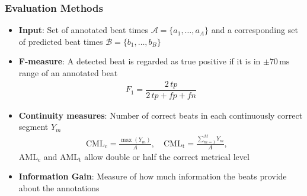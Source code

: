 \documentclass{beamer}
\begin{document}
% 

\begin{frame}
\frametitle{Evaluation Methods}

\begin{itemize}
\item \textbf{Input}: Set of annotated beat times $\mathcal A = \{a_1, \dots, a_A\}$ and a corresponding set of predicted beat times $\mathcal B = \{b_1, \dots, b_B\}$
\item \textbf{F-measure}: A detected beat is regarded as true positive if it is in $\pm 70\,\text{ms}$ range of an annotated beat
\begin{align}
F_1= \dfrac{2\, tp}{2\, tp + fp + fn}
\end{align} 
\item \textbf{Continuity measures}: Number of correct beats in each continuously correct segment $Y_m$
\begin{align}
\text{CML}_\text{c} = \frac{\max(Y_m)}{A}, \quad
\text{CML}_\text{t} = \frac{\sum_{m=1}^MY_m}{A},\quad
\end{align} 
$\text{AML}_\text{c}$ and $\text{AML}_\text{t}$ allow double or half the correct metrical level
\item \textbf{Information Gain}: Measure of how much information the beats provide about the annotations \cite{Davies2009b}
\end{itemize}
\end{frame}
\end{document}
